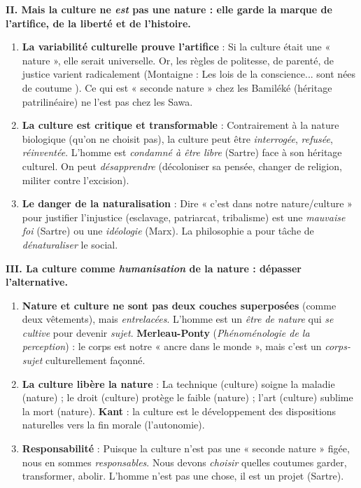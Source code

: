 \documentclass[11pt]{article}
\begin{document}
\begin{exoresolu}
\textbf{II. Mais la culture ne \emph{est} pas une nature : elle garde la marque de l'artifice, de la liberté et de l'histoire.}
\begin{enumerate}
    \item \textbf{La variabilité culturelle prouve l'artifice} : Si la culture était une « nature », elle serait universelle. Or, les règles de politesse, de parenté, de justice varient radicalement (Montaigne : \guillemotleft Les lois de la conscience... sont nées de coutume \guillemotright). Ce qui est « seconde nature » chez les Bamiléké (héritage patrilinéaire) ne l'est pas chez les Sawa.
    \item \textbf{La culture est critique et transformable} : Contrairement à la nature biologique (qu'on ne choisit pas), la culture peut être \emph{interrogée}, \emph{refusée}, \emph{réinventée}. L'homme est \emph{condamné à être libre} (Sartre) face à son héritage culturel. On peut \emph{désapprendre} (décoloniser sa pensée, changer de religion, militer contre l'excision).
    \item \textbf{Le danger de la naturalisation} : Dire « c'est dans notre nature/culture » pour justifier l'injustice (esclavage, patriarcat, tribalisme) est une \emph{mauvaise foi} (Sartre) ou une \emph{idéologie} (Marx). La philosophie a pour tâche de \emph{dénaturaliser} le social.
\end{enumerate}

\textbf{III. La culture comme \emph{humanisation} de la nature : dépasser l'alternative.}
\begin{enumerate}
    \item \textbf{Nature et culture ne sont pas deux couches superposées} (comme deux vêtements), mais \emph{entrelacées}. L'homme est un \emph{être de nature} qui \emph{se cultive} pour devenir \emph{sujet}. \textbf{Merleau-Ponty} (\emph{Phénoménologie de la perception}) : le corps est notre « ancre dans le monde », mais c'est un \emph{corps-sujet} culturellement façonné.
    \item \textbf{La culture libère la nature} : La technique (culture) soigne la maladie (nature) ; le droit (culture) protège le faible (nature) ; l'art (culture) sublime la mort (nature). \textbf{Kant} : la culture est le développement des dispositions naturelles vers la fin morale (l'autonomie).
    \item \textbf{Responsabilité} : Puisque la culture n'est pas une « seconde nature » figée, nous en sommes \emph{responsables}. Nous devons \emph{choisir} quelles coutumes garder, transformer, abolir. \guillemotleft L'homme n'est pas une chose, il est un projet \guillemotright (Sartre).
\end{enumerate}


\end{exoresolu}
\end{document}
